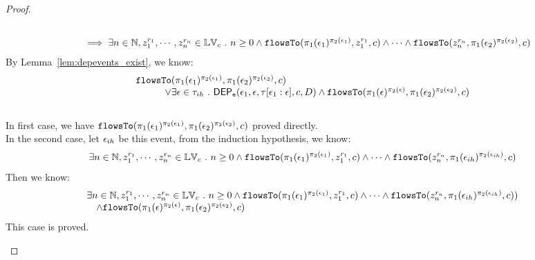 \begin{proof}
\begin{case}
\[\begin{array}{l}
          \\ \quad 
          \implies 
          \exists n \in \mathbb{N}, z_1^{r_1}, \cdots, z_n^{r_n} \in \mathbb{LV}_{{c}}  ~.~ n \geq 0 \land
          \mathtt{flowsTo}(\pi_1(\mathtt{\epsilon}_1)^{\pi_2(\mathtt{\epsilon}_1)},  z_1^{r_1}, c) 
          \land \cdots \land \mathtt{flowsTo}(z_n^{r_n}, \pi_1(\mathtt{\epsilon}_2)^{\pi_2(\mathtt{\epsilon}_2)}, c) 
        \end{array}
        \]
        By Lemma~\ref{lem:depevents_exist}, we know:
        \[
          \begin{array}{l}
            \mathtt{flowsTo}(\pi_1(\mathtt{\epsilon}_1)^{\pi_2(\mathtt{\epsilon}_1)}, \pi_1(\mathtt{\epsilon}_2)^{\pi_2(\mathtt{\epsilon}_2)}, c) 
        \\ \qquad \quad \lor
        \exists \mathtt{\epsilon} \in \mathtt{\tau}_{ih}  ~.~ 
          \mathsf{DEP_{\mathtt{e}}}(\mathtt{\epsilon}_1, \mathtt{\epsilon}, \mathtt{\tau}[\mathtt{\epsilon}_1:\mathtt{\epsilon}], c, D)
        \land 
        \mathtt{flowsTo}(\pi_1(\mathtt{\epsilon})^{\pi_2(\mathtt{\epsilon})}, \pi_1(\mathtt{\epsilon}_2)^{\pi_2(\mathtt{\epsilon}_2)}, c) 
      \end{array}
      \]
        \\
        In first case, we have $\mathtt{flowsTo}(\pi_1(\mathtt{\epsilon}_1)^{\pi_2(\mathtt{\epsilon}_1)}, \pi_1(\mathtt{\epsilon}_2)^{\pi_2(\mathtt{\epsilon}_2)}, c) $ proved directly.
        \\
        In the second case, let $\mathtt{\epsilon}_{ih}$ be this event, from the induction hypothesis, we know:
        \[
          \exists n \in \mathbb{N}, z_1^{r_1}, \cdots, z_n^{r_n} \in \mathbb{LV}_{{c}}  ~.~ n \geq 0 \land
            \mathtt{flowsTo}(\pi_1(\mathtt{\epsilon}_1)^{\pi_2(\mathtt{\epsilon}_1)},  z_1^{r_1}, c) 
            \land \cdots \land \mathtt{flowsTo}(z_n^{r_n}, \pi_1(\mathtt{\epsilon}_{ih})^{\pi_2(\mathtt{\epsilon}_{ih})}, c) 
          \]
          Then we know:
          \[
            \begin{array}{l}
              \exists n \in \mathbb{N}, z_1^{r_1}, \cdots, z_n^{r_n} \in \mathbb{LV}_{{c}}  ~.~ n \geq 0 \land
            \mathtt{flowsTo}(\pi_1(\mathtt{\epsilon}_1)^{\pi_2(\mathtt{\epsilon}_1)},  z_1^{r_1}, c) 
            \land \cdots \land \mathtt{flowsTo}(z_n^{r_n}, \pi_1(\mathtt{\epsilon}_{ih})^{\pi_2(\mathtt{\epsilon}_{ih})}, c) )
             \\ \quad  
             \land  \mathtt{flowsTo}(\pi_1(\mathtt{\epsilon})^{\pi_2(\mathtt{\epsilon})}, \pi_1(\mathtt{\epsilon}_2)^{\pi_2(\mathtt{\epsilon}_2)}, c) 
            \end{array}
            \]
            This case is proved.
      \end{case}


\end{proof}
